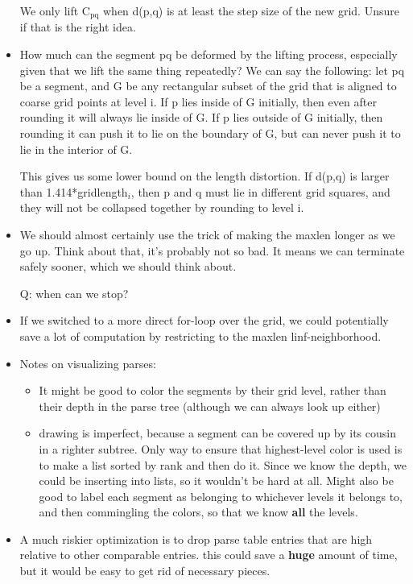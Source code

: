 \documentclass{book}
\begin{document}
\begin{itemize}
    We only lift C$_{\mathrm{pq}}$ when d(p,q) is at least the step size of the new
    grid. Unsure if that is the right idea.
\item How much can the segment pq be deformed by the lifting process,
    especially given that we lift the same thing repeatedly? We can
    say the following: let pq be a segment, and G be any rectangular
    subset of the grid that is aligned to coarse grid points at level
    i. If p lies inside of G initially, then even after rounding it
    will always lie inside of G. If p lies outside of G initially,
    then rounding it can push it to lie on the boundary of G, but can
    never push it to lie in the interior of G.

    This gives us some lower bound on the length distortion. If d(p,q)
    is larger than 1.414*gridlength$_i$, then p and q must lie in
    different grid squares, and they will not be collapsed together by
    rounding to level i.
\item We should almost certainly use the trick of making the maxlen
    longer as we go up. Think about that, it's probably not so bad. It
    means we can terminate safely sooner, which we should think about.

    Q: when can we stop?
\item If we switched to a more direct for-loop over the grid, we could
    potentially save a lot of computation by restricting to the maxlen
    linf-neighborhood.
\item Notes on visualizing parses:

\begin{itemize}
\item It might be good to color the segments by their grid level,
      rather than their depth in the parse tree (although we can
      always look up either)
\item drawing is imperfect, because a segment can be covered up by its
      cousin in a righter subtree. Only way to ensure that
      highest-level color is used is to make a list sorted by rank and
      then do it. Since we know the depth, we could be inserting into
      lists, so it wouldn't be hard at all. Might also be good to
      label each segment as belonging to whichever levels it belongs
      to, and then commingling the colors, so that we know \textbf{all} the
      levels.
\end{itemize}

\item A much riskier optimization is to drop parse table entries that
    are high relative to other comparable entries. this could save a
    \textbf{huge} amount of time, but it would be easy to get rid of
    necessary pieces. 


\end{itemize}
\end{document}
